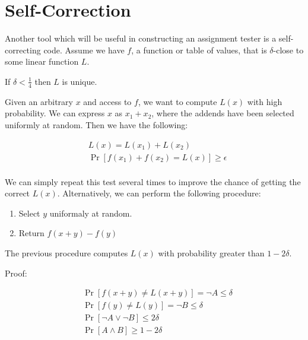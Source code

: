 \documentclass[12pt]{article}
\begin{document}
\section{Self-Correction}

Another tool which will be useful in constructing an assignment tester is
a self-correcting code. Assume we have $f$, a function or table of values,
that is $\delta$-close to some linear function $L$.

\begin{remark}
If $\delta < \frac{1}{4}$ then $L$ is unique.
\end{remark}

Given an arbitrary $x$ and access to $f$, we want to compute $L(x)$ with
high probability. We can express $x$ as $x_1 + x_2$, where the addends
have been selected uniformly at random. Then we have the following:

\begin{eqnarray*}
&  L(x) = L(x_1) + L(x_2)\\
&  \Pr{\left[ f(x_1) + f(x_2) = L(x) \right]} \ge \epsilon\\
\end{eqnarray*}

We can simply repeat this test several times to improve the chance of
getting the correct $L(x)$. Alternatively, we can perform the following
procedure:

\begin{enumerate}
\item Select $y$ uniformaly at random.
\item Return $f(x+y) - f(y)$
\end{enumerate}

\begin{lemma}
The previous procedure computes $L(x)$ with probability greater than
$1 - 2\delta$.
\begin{displaymath}
\end{displaymath}

Proof:

\begin{eqnarray*}
& \Pr{\left[ f(x+y) \ne L(x+y) \right]} = \lnot A \le \delta\\
& \Pr{\left[ f(y) \ne L(y) \right]} = \lnot B \le \delta\\
& \Pr{\left[\lnot A \lor \lnot B\right]} \le 2\delta\\
& \Pr{\left[A \land B \right]} \ge 1 - 2\delta
\end{eqnarray*}
\end{lemma}
\end{document}
